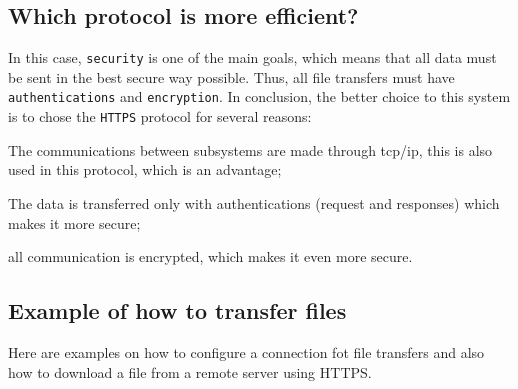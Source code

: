 \subsection{Which protocol is more efficient?}
\label{sub-sec:prot-effic}

In this case, \texttt{security} is one of the main goals, which means that all data must be sent in the best secure way possible. Thus, all file transfers must have \texttt{authentications} and \texttt{encryption}.
%
In conclusion, the better choice to this system is to chose the \texttt{HTTPS} protocol for several reasons:
\begin{item-c}
\item The communications between subsystems are made through \gls{tcp}/\gls{ip}, this is also used in this protocol, which is an advantage;
\item The data is transferred only with authentications (request and responses) which makes it more secure;
\item all communication is encrypted, which makes it even more secure.
\end{item-c} 

\subsection{Example of how to transfer files}
\label{sub-sec:file-transf-ex}

Here are examples on how to configure a connection fot file transfers and also how to download a file from a remote server using HTTPS.

